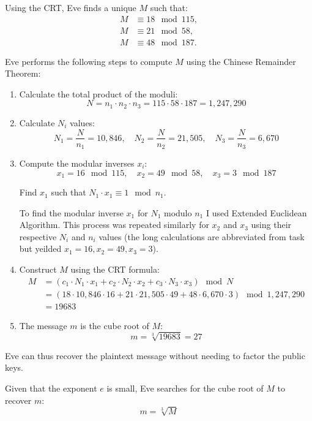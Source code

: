 \documentclass{article}
\begin{document}
Using the CRT, Eve finds a unique \( M \) such that:
\begin{align*}
    M &\equiv 18 \mod 115, \\
    M &\equiv 21 \mod 58, \\
    M &\equiv 48 \mod 187.
\end{align*}

Eve performs the following steps to compute \(M\) using the Chinese Remainder Theorem:

\begin{enumerate}
    \item Calculate the total product of the moduli:
    \[ N = n_1 \cdot n_2 \cdot n_3 = 115 \cdot 58 \cdot 187 = 1,247,290 \]

    \item Calculate \(N_i\) values:
    \[ N_1 = \frac{N}{n_1} = 10,846, \quad N_2 = \frac{N}{n_2} = 21,505, \quad N_3 = \frac{N}{n_3} = 6,670 \]

    \item Compute the modular inverses \(x_i\):
    \[ x_1 = 16 \mod 115, \quad x_2 = 49 \mod 58, \quad x_3 = 3 \mod 187 \]

    Find \( x_1 \) such that \( N_1 \cdot x_1 \equiv 1 \mod n_1 \).

    To find the modular inverse \( x_1 \) for \( N_1 \) modulo \( n_1 \) I used Extended Euclidean Algorithm.
    This process was repeated similarly for \( x_2 \) and \( x_3 \) using their respective \( N_i \) and \( n_i \) values
    (the long calculations are abbreviated from task but yeilded \( x_1=16, x_2=49, x_3=3 \)).

    \item Construct \(M\) using the CRT formula:
    \begin{align*}
        M &= (c_1 \cdot N_1 \cdot x_1 + c_2 \cdot N_2 \cdot x_2 + c_3 \cdot N_3 \cdot x_3) \mod N \\
        &= (18 \cdot 10,846 \cdot 16 + 21 \cdot 21,505 \cdot 49 + 48 \cdot 6,670 \cdot 3) \mod 1,247,290 \\
        &= 19683
    \end{align*}

    \item The message \(m\) is the cube root of \(M\):
    \[ m = \sqrt[3]{19683} = 27 \]
\end{enumerate}

Eve can thus recover the plaintext message without needing to factor the public keys.


Given that the exponent \( e \) is small, Eve searches for the cube root of \( M \) to recover \( m \):
\[ m = \sqrt[3]{M} \]
\end{document}
